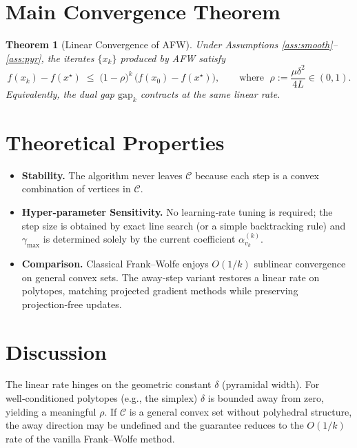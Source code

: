 \documentclass{article}
\newtheorem{theorem}{Theorem}
\newcommand{\cC}{\mathcal{C}}
\newcommand{\gap}{\mathrm{gap}}
\begin{document}
\section*{Main Convergence Theorem}
\begin{theorem}[Linear Convergence of AFW]\label{thm:linear}
Under Assumptions \ref{ass:smooth}–\ref{ass:pyr}, the iterates $\{x_k\}$ produced by AFW satisfy
\[
f(x_k)-f(x^\star)\;\le\;
\bigl(1-\rho\bigr)^{k}\,\bigl(f(x_0)-f(x^\star)\bigr),
\qquad\text{where }\;
\rho:=\frac{\mu\delta^{2}}{4L}\in(0,1).
\]
Equivalently, the dual gap $\gap_k$ contracts at the same linear rate.
\end{theorem}

\section*{Theoretical Properties}
\begin{itemize}
\item \textbf{Stability.} The algorithm never leaves $\cC$ because each step is a convex combination of vertices in $\cC$.
\item \textbf{Hyper‑parameter Sensitivity.} No learning‑rate tuning is required; the step size is obtained by exact line search (or a simple backtracking rule) and $\gamma_{\max}$ is determined solely by the current coefficient $\alpha_{v_k}^{(k)}$.
\item \textbf{Comparison.} Classical Frank–Wolfe enjoys $O(1/k)$ sublinear convergence on general convex sets. The away‑step variant restores a linear rate on polytopes, matching projected gradient methods while preserving projection‑free updates.
\end{itemize}

\section*{Discussion}
The linear rate hinges on the geometric constant $\delta$ (pyramidal width). For well‑conditioned polytopes (e.g., the simplex) $\delta$ is bounded away from zero, yielding a meaningful $\rho$. If $\cC$ is a general convex set without polyhedral structure, the away direction may be undefined and the guarantee reduces to the $O(1/k)$ rate of the vanilla Frank–Wolfe method.

\newpage
\end{document}
